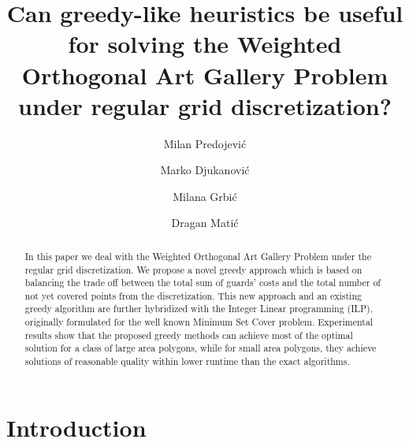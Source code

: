 \documentclass[runningheads,a4paper]{elsarticle}
\begin{document}
	
	
	\title{Can greedy-like heuristics be useful for solving the Weighted Orthogonal Art Gallery Problem under regular grid discretization?}
	
	\author[1]{Milan Predojevi\'c}
\author[1]{Marko Djukanovi\'c}
\author[1]{Milana Grbi\'c}
\author[1]{Dragan Mati\'c}
    \address[1]{Faculty of Natural Science and Mathematics, University of Banja Luka, Bosnia and Herzegovina}

	\begin{abstract}
		In this paper we deal with the Weighted Orthogonal Art Gallery Problem under the regular grid discretization. We propose a novel greedy approach which is based on balancing the trade off between the total sum of guards' costs and the total number of not yet covered points from the discretization. This new approach and an existing greedy algorithm are further  hybridized with the Integer Linear programming (ILP), originally formulated for the well known Minimum Set Cover problem. Experimental results show that the proposed greedy methods can achieve most of the optimal solution for a class of large area polygons, while for small area polygons, they achieve solutions of reasonable quality within lower runtime than the exact algorithms. 
	\end{abstract}
	\maketitle
	
	
	\section{Introduction}\label{sec:introduction}
	
\end{document}
